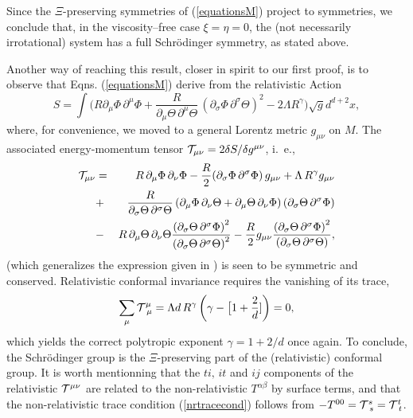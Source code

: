 \documentclass[11pt,a4paper]{article}
\begin{document}
Since the $\Xi$-preserving symmetries of (\ref{equationsM}) project to
symmetries, we
 conclude that, in the viscosity--free case $\xi=\eta=0$, the
(not necessarily irrotational)
system has a full Schr\"{o}dinger symmetry, as stated above.

Another way of reaching this result, closer in spirit to our first proof,
is to observe that
 Eqns. (\ref{equationsM}) derive from the relativistic Action
\begin{equation}
S=\int\Big(R\partial_\mu\Phi\,\partial^\mu\Phi
+\frac{R}{\partial_\mu\Theta\,\partial^\mu\Theta}\,
\left(\partial_\sigma\Phi\,
\partial^\sigma\Theta\right)^2-2\Lambda
R^{\gamma}\Big)\sqrt{g}d^{d+2}x,
\end{equation}
where, for convenience, we moved to a general Lorentz metric
$g_{\mu\nu}$ on $M$.
The associated energy-momentum tensor
${\cal T}_{\mu\nu}=2\delta S/\delta g^{\mu\nu}$, i.~e.,
\begin{eqnarray}
{\cal T}_{\mu\nu} &=& R\,\partial_\mu\Phi\,\partial_\nu\Phi
-\frac{R}{2}(\partial_\sigma\Phi\,\partial^\sigma\Phi)\,g_{\mu\nu}
+\Lambda\,R^{\gamma}g_{\mu\nu}\nonumber\\
     &+&\frac{R}{\partial_\sigma\Theta\,\partial^\sigma\Theta}
     \left(\partial_\mu\Phi\,\partial_\nu\Theta
     +\partial_\mu\Theta\,\partial_\nu\Phi\right)
     (\partial_\sigma\Theta\,\partial^\sigma\Phi)\nonumber\\
      &-&R\,
      \partial_\mu\Theta\,\partial_\nu\Theta
      \frac{\left(\partial_\sigma\Theta\,\partial^\sigma\Phi\right)^2}
{\left(\partial_\sigma\Theta\,\partial^\sigma\Theta\right)^2}
	   -\frac{R}{2}g_{\mu\nu}
	   \frac{\left(\partial_\sigma\Theta\,\partial^\sigma\Phi
	   \right)^2}
{\left(\partial_\sigma\Theta\,\partial^\sigma\Theta\right)},
\end{eqnarray}
(which generalizes the expression given in \cite{HH})
is seen to be symmetric and conserved. Relativistic conformal
invariance  requires the vanishing of its trace,
\begin{equation}
\sum_{\mu}{\cal T}^\mu_{\ \mu}=
\Lambda d\,R^{\gamma} \left(\gamma-\big[1+
\frac{2}{d}]\right)=0,
\label{relattrace}
\end{equation}
which yields the correct polytropic exponent
$\gamma=1+2/d$ once again. To conclude, the Schr\"odinger
group is the $\Xi$-preserving part of the (relativistic) conformal group.
It is worth mentionning that the $ti,\, it$ and $ij$ components of
 the relativistic ${\cal T}^{\mu\nu}$ are related to
 the non-relativistic $T^{\alpha\beta}$ by surface terms,
 and that the non-relativistic trace condition (\ref{nrtracecond})
 follows from $-T^{00}={\cal T}^s_{\ s}={\cal T}^t_{\ t}$.
\end{document}
